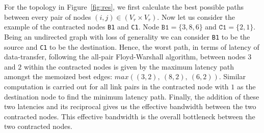 \begin{itemize}
  For the topology in Figure~\ref{fig:res}, we first calculate the best
  possible paths between every pair of nodes \mbox{$(i,j) \in (V_r
    \times V_r)$}. Now let us consider the example of the contracted
  nodes \texttt{B1} and \texttt{C1}. Node $\mathtt{B1} = \{3, 8, 6\}$
  and $\mathtt{C1} = \{2, 1\}$. Being an undirected graph with loss of
  generality we can consider \texttt{B1} to be the source and
  \texttt{C1} to be the destination. Hence, the worst path, in terms of
  latency of data-transfer, following the all-pair Floyd-Warshall
  algorithm, between nodes $3$ and $2$ within the contracted nodes is
  given by the maximum latency path amongst the memoized best edges:
  $max((3,2),\ (8,2),\ (6,2))$. Similar computation is carried out for
  all link pairs in the contracted node with $1$ as the destination node
  to find the minimum latency path. Finally, the addition of these two
  latencies and its reciprocal gives us the effective bandwidth between
  the two contracted nodes. This effective bandwidth is the overall
  bottleneck between the two contracted nodes.




\end{itemize}


